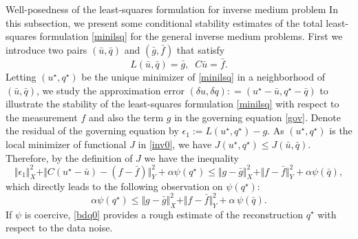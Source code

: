 \documentclass[11pt]{article}%
\renewcommand{\_}{{\fontfamily{ptm}\selectfont\textunderscore}}
\theoremstyle{plain}
\numberwithin{equation}{section}
\newtheorem{lemma}{Lemma}
\begin{document}
\begin{section}{Well-posedness of the least-squares formulation for inverse medium problem}
In this subsection, we present some conditional stability estimates of the total least-squares formulation \eqref{minilsq} for the general inverse medium problems. First we introduce two pairs $(\bar{u},\bar{q})$ and $(\bar{g},\bar{f})$ that satisfy
\begin{equation}\label{0}
L(\bar{u},\bar{ q})=\bar{g},\;\; C\bar{u}=\bar{f}.
\end{equation}
Letting $(u^\star, q^\star)$ be the unique minimizer of \eqref{minilsq} in a neighborhood of $(\bar{u},\bar{q})$, we study the approximation error $(\delta u,\delta q): = (u^\star-\bar{u}, q^\star-\bar{q})$ to illustrate the stability of the least-squares formulation \eqref{minilsq} with respect to the measurement $f$ and also the term $g$ in the governing equation \eqref{gov}. Denote the residual of the governing equation by $\epsilon_1 :=L(u^\star, q^\star)-g$.
As $(u^\star,q^\star)$ is the local minimizer of functional $J$ in \eqref{inv0}, we have $J(u^\star, q^\star)\leq J(\bar{u},\bar{q})$. Therefore, by the definition of $J$ we have the inequality 
\begin{equation}
\Vert \epsilon_1\Vert_X^2+\Vert C(u^\star-\bar{u})-(f-\bar{f})\Vert_Y^2
+\alpha\psi(q^\star)\le \Vert g-\bar{g}\Vert_X^2+\Vert f-\bar{f}\Vert_Y^2+\alpha\psi(\bar{q}),\label{ineqbar}
\end{equation}
 which directly leads to the following observation on $\psi(q^\star)$:
\begin{equation}
\alpha \psi(q^\star)\le \Vert g-\bar{g}\Vert_X^2+\Vert f-\bar{f}\Vert_Y^2+\alpha\,\psi(\bar{q}).\label{bdq0}
\end{equation}
If $\psi$ is coercive, \eqref{bdq0} provides a rough estimate of the reconstruction $q^\star$ with respect to the data noise. 


\end{section}
\end{document}
